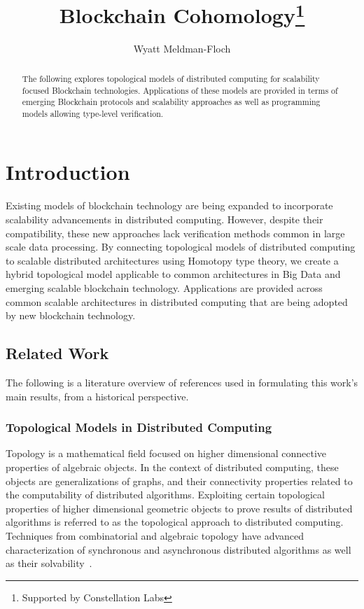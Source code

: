 \documentclass[runningheads]{llncs}
\begin{document}
%
\title{Blockchain Cohomology\thanks{Supported by Constellation Labs}}
%
%
\author{Wyatt Meldman-Floch }
%
%
%
\maketitle              %
%
\begin{abstract}
The following explores topological models of distributed computing for scalability focused Blockchain technologies. Applications of these models are provided in terms of emerging Blockchain protocols and scalability approaches as well as programming models allowing type-level verification.
\end{abstract}
%
%
%
\section{Introduction} 
Existing models of blockchain technology are being expanded to incorporate scalability advancements in distributed computing. However, despite their compatibility, these new approaches lack verification methods common in large scale data processing. By connecting topological models of distributed computing to scalable distributed architectures using Homotopy type theory, we create a hybrid topological model applicable to common architectures in Big Data and emerging scalable blockchain technology. Applications are provided across common scalable architectures in distributed computing that are being adopted by new blockchain technology.

\subsection{Related Work}
The following is a literature overview of references used in formulating this work's main results, from a historical perspective. 

\subsubsection{Topological Models in Distributed Computing}
Topology is a mathematical field focused on higher dimensional connective properties of algebraic objects. In the context of distributed computing, these objects are generalizations of graphs, and their connectivity properties related to the computability of distributed algorithms. Exploiting certain topological properties of higher dimensional geometric objects to prove results of distributed algorithms is referred to as the topological approach to distributed computing. Techniques from combinatorial and algebraic topology have advanced characterization of synchronous and asynchronous distributed algorithms as well as their solvability~\cite{ref_article1,ref_article2,ref_article3,ref_article4}. 
\end{document}
